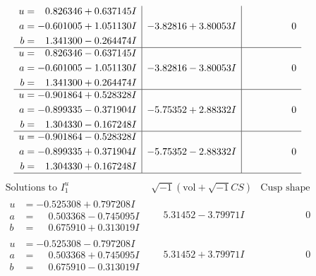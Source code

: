 \documentclass[1p]{elsarticle_modified}
\theoremstyle{definition}
\newcommand{\I}{\sqrt{-1}}
\begin{document}
$$\begin{array}{c|c|c}
\begin{aligned}
u &= \phantom{-}0.826346 + 0.637145 I \\
a &= -0.601005 + 1.051130 I \\
b &= \phantom{-}1.341300 - 0.264474 I\end{aligned}
 & -3.82816 + 3.80053 I & \phantom{-0.000000 } 0 \\ \hline\begin{aligned}
u &= \phantom{-}0.826346 - 0.637145 I \\
a &= -0.601005 - 1.051130 I \\
b &= \phantom{-}1.341300 + 0.264474 I\end{aligned}
 & -3.82816 - 3.80053 I & \phantom{-0.000000 } 0 \\ \hline\begin{aligned}
u &= -0.901864 + 0.528328 I \\
a &= -0.899335 - 0.371904 I \\
b &= \phantom{-}1.304330 - 0.167248 I\end{aligned}
 & -5.75352 + 2.88332 I & \phantom{-0.000000 } 0 \\ \hline\begin{aligned}
u &= -0.901864 - 0.528328 I \\
a &= -0.899335 + 0.371904 I \\
b &= \phantom{-}1.304330 + 0.167248 I\end{aligned}
 & -5.75352 - 2.88332 I & \phantom{-0.000000 } 0\\
 \hline 
 \end{array}$$\newpage$$\begin{array}{c|c|c}  
\text{Solutions to }I^u_{1}& \I (\text{vol} + \sqrt{-1}CS) & \text{Cusp shape}\\
 \hline 
\begin{aligned}
u &= -0.525308 + 0.797208 I \\
a &= \phantom{-}0.503368 - 0.745095 I \\
b &= \phantom{-}0.675910 + 0.313019 I\end{aligned}
 & \phantom{-}5.31452 - 3.79971 I & \phantom{-0.000000 } 0 \\ \hline\begin{aligned}
u &= -0.525308 - 0.797208 I \\
a &= \phantom{-}0.503368 + 0.745095 I \\
b &= \phantom{-}0.675910 - 0.313019 I\end{aligned}
 & \phantom{-}5.31452 + 3.79971 I & \phantom{-0.000000 } 0 \\ \hline\begin{aligned}

\end{aligned}
\end{array}$$
\end{document}
